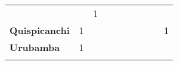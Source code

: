 \begin{tabular}{lccccccccc}
	&\cellcolor[HTML]{FCC46C}                   &1
	&\cellcolor[HTML]{FCC46C} 					&\cellcolor[HTML]{FCC46C}		&\cellcolor[HTML]{FCC46C}\\
	\textbf{Quispicanchi}                       
    &1                   
	&\cellcolor[HTML]{FCC46C}                   &\cellcolor[HTML]{FCC46C}                  
	&\cellcolor[HTML]{FCC46C}                   &\cellcolor[HTML]{FCC46C} 	  &\cellcolor[HTML]{FCC46C} 					&\cellcolor[HTML]{FCC46C} 					
	&\cellcolor[HTML]{FCC46C}					&1\\
	\textbf{Urubamba}                                   
	&1                   
	&\cellcolor[HTML]{FCC46C}                   &\cellcolor[HTML]{FCC46C}                     &\cellcolor[HTML]{FCC46C}                   &\cellcolor[HTML]{FCC46C} 		 &\cellcolor[HTML]{FCC46C}					&\cellcolor[HTML]{FCC46C}      
	&\cellcolor[HTML]{FCC46C}					&\cellcolor[HTML]{FCC46C}		\\
	&\multicolumn{1}{l}{}                       &\multicolumn{1}{l}{}            &\multicolumn{1}{l}{}                         
	&\multicolumn{1}{l}{}                       &\multicolumn{1}{l}{}            &\multicolumn{1}{l}{}                       &\multicolumn{1}{l}{}                       &\multicolumn{1}{l}{}            &\multicolumn{1}{l}{}    
\end{tabular}